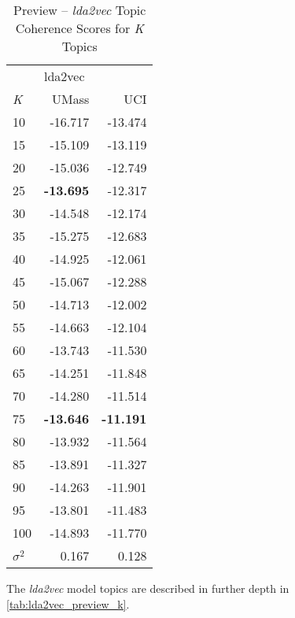 \documentclass[letterpaper,12pt]{article}
\begin{document}
\begin{table}
	\caption{\label{tab:lda2vec_preview_tc} Preview -- \emph{lda2vec} Topic Coherence Scores for \emph{K} Topics}
	\begin{center}
		\begin{tabular}{lrr}
			\toprule
			{} & \multicolumn{2}{l}{lda2vec} \\
			\emph{K} &   UMass &     UCI \\
			\midrule
			10  & -16.717 & -13.474 \\
			15  & -15.109 & -13.119 \\
			20  & -15.036 & -12.749 \\
			25  & \textbf{-13.695} & -12.317 \\
			30  & -14.548 & -12.174 \\
			35  & -15.275 & -12.683 \\
			40  & -14.925 & -12.061 \\
			45  & -15.067 & -12.288 \\
			50  & -14.713 & -12.002 \\
			55  & -14.663 & -12.104 \\
			60  & -13.743 & -11.530 \\
			65  & -14.251 & -11.848 \\
			70  & -14.280 & -11.514 \\
			75  & \textbf{-13.646} & \textbf{-11.191} \\
			80  & -13.932 & -11.564 \\
			85  & -13.891 & -11.327 \\
			90  & -14.263 & -11.901 \\
			95  & -13.801 & -11.483 \\
			100 & -14.893 & -11.770 \\
			\midrule
			$\sigma^2$ & 0.167 & 0.128 \\
			\bottomrule
			\end{tabular}
	\end{center}
\end{table}



The \emph{lda2vec} model topics are described in further depth in \ref{tab:lda2vec_preview_k}.
\end{document}
